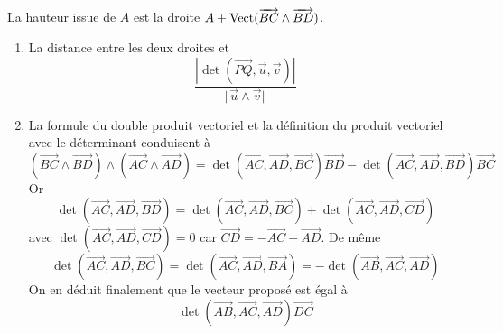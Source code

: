 La hauteur issue de $A$ est la droite $A+\operatorname{Vect}(\overrightarrow{BC}\wedge \overrightarrow{BD})$.
\begin{enumerate}
 \item La distance entre les deux droites et
\begin{displaymath}
 \frac{\left|\det(\overrightarrow{PQ},\overrightarrow u ,\overrightarrow v )\right|}
{\Vert \overrightarrow{u}\wedge \overrightarrow{v}\Vert}
\end{displaymath}

 \item La formule du double produit vectoriel et la définition du produit vectoriel avec le déterminant conduisent à
\begin{displaymath}
 (\overrightarrow{BC}\wedge \overrightarrow{BD})\wedge (\overrightarrow{AC}\wedge \overrightarrow{AD})
= \det(\overrightarrow{AC},\overrightarrow{AD},\overrightarrow{BC}) \overrightarrow{BD}
- \det(\overrightarrow{AC},\overrightarrow{AD},\overrightarrow{BD}) \overrightarrow{BC}
\end{displaymath}
Or 
\begin{displaymath}
 \det(\overrightarrow{AC},\overrightarrow{AD},\overrightarrow{BD})
= \det(\overrightarrow{AC},\overrightarrow{AD},\overrightarrow{BC})
+ \det(\overrightarrow{AC},\overrightarrow{AD},\overrightarrow{CD})
\end{displaymath}
avec  $\det(\overrightarrow{AC},\overrightarrow{AD},\overrightarrow{CD})=0$ 
car $\overrightarrow{CD} = -\overrightarrow{AC}+\overrightarrow{AD}$.\newline
De même
\begin{displaymath}
\det(\overrightarrow{AC},\overrightarrow{AD},\overrightarrow{BC}) = \det(\overrightarrow{AC},\overrightarrow{AD},\overrightarrow{BA})
= -\det(\overrightarrow{AB},\overrightarrow{AC},\overrightarrow{AD}) 
\end{displaymath}
On en déduit finalement que le vecteur proposé est égal à
\begin{displaymath}
 \det(\overrightarrow{AB},\overrightarrow{AC},\overrightarrow{AD})\overrightarrow{DC}
\end{displaymath}


\end{enumerate}
